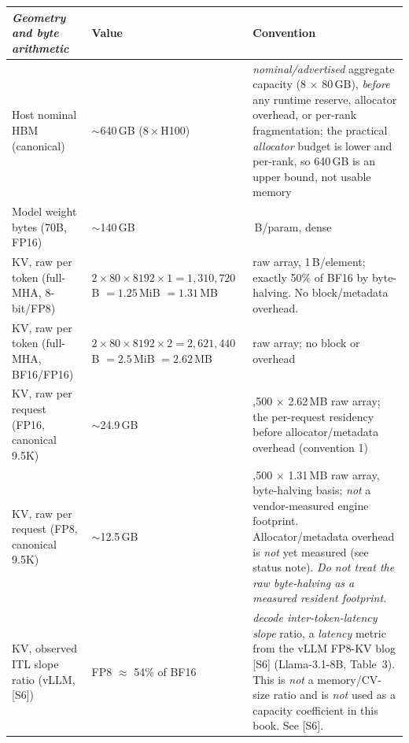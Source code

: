 \noindent\begin{tabularx}{\textwidth}{@{}>{\raggedright\arraybackslash}p{1.85in} >{\raggedright\arraybackslash}p{2.05in} >{\raggedright\arraybackslash}X@{}}
\toprule
\emph{Geometry and byte arithmetic} & \textbf{Value} & \textbf{Convention}\\
\midrule
Host nominal HBM (canonical) & $\sim$640\,GB (8\,$\times$\,H100) & \emph{nominal/advertised} aggregate capacity (8 $\times$ 80\,GB), \emph{before} any runtime reserve, allocator overhead, or per-rank fragmentation; the practical \emph{allocator} budget is lower and per-rank, so 640\,GB is an upper bound, not usable memory\\
Model weight bytes (70B, FP16) & $\sim$140\,GB & 2\,B/param, dense\\
KV, raw per token (full-MHA, 8-bit/FP8) & $2 \times 80 \times 8192 \times 1 = 1{,}310{,}720$\,B $= 1.25$\,MiB $= 1.31$\,MB & raw array, 1\,B/element; exactly 50\% of BF16 by byte-halving. No block/metadata overhead.\\
KV, raw per token (full-MHA, BF16/FP16) & $2 \times 80 \times 8192 \times 2 = 2{,}621{,}440$\,B $= 2.5$\,MiB $= 2.62$\,MB & raw array; no block or overhead\\
KV, raw per request (FP16, canonical 9.5K) & $\sim$24.9\,GB & 9,500 $\times$ 2.62\,MB raw array; the per-request residency before allocator/metadata overhead (convention 1)\\
KV, raw per request (FP8, canonical 9.5K) & $\sim$12.5\,GB & 9,500 $\times$ 1.31\,MB raw array, byte-halving basis; \emph{not} a vendor-measured engine footprint. Allocator/metadata overhead is \emph{not} yet measured (see status note). \emph{Do not treat the raw byte-halving as a measured resident footprint.}\\
KV, observed ITL slope ratio (vLLM, \textsc{[S6]}) & FP8 $\approx$ 54\% of BF16 & \emph{decode inter-token-latency slope} ratio, a \emph{latency} metric from the vLLM FP8-KV blog \textsc{[S6]} (Llama-3.1-8B, Table~3). This is \emph{not} a memory/CV-size ratio and is \emph{not} used as a capacity coefficient in this book. See \textsc{[S6]}.\\
\bottomrule
\end{tabularx}

